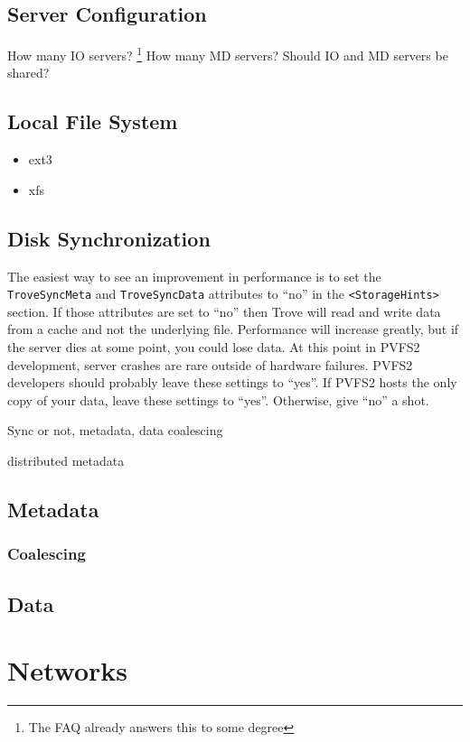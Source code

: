 \documentclass[11pt,letterpaper]{article}
\begin{document}
\subsection{Server Configuration}

How many IO servers? \footnote{The FAQ already answers this to some
degree}
How many MD servers?
Should IO and MD servers be shared?

\subsection{Local File System}

\begin{itemize}
\item ext3
\item xfs
\end{itemize}

\subsection{Disk Synchronization}

The easiest way to see an improvement in performance is to set the
\texttt{TroveSyncMeta} and \texttt{TroveSyncData} attributes to ``no''
in the \texttt{<StorageHints>} section.  If those attributes are set to
``no'' then Trove will read and write data from a cache and not the
underlying file.  Performance will increase greatly, but if the server
dies at some point, you could lose data.  At this point in PVFS2
development, server crashes are rare outside of hardware failures.
PVFS2 developers should probably leave these settings to ``yes''.  If
PVFS2 hosts the only copy of your data, leave these settings to ``yes''.
Otherwise, give ``no'' a shot.

Sync or not, metadata, data
  coalescing

  distributed metadata

\subsection{Metadata}
\subsubsection{Coalescing}

\subsection{Data}

\section{Networks}
\end{document}
